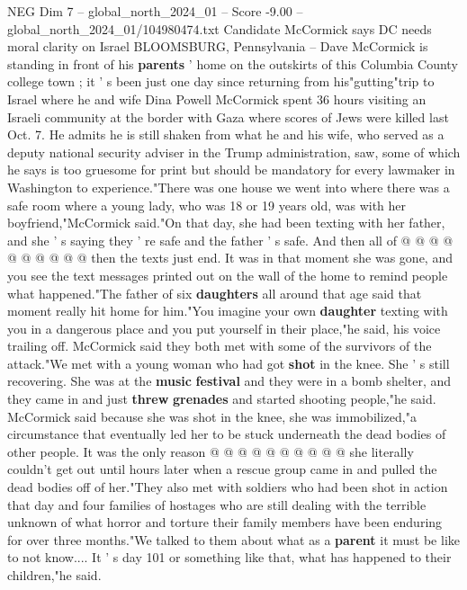 \begin{textsample}{NEG Dim 7 – global\_north\_2024\_01 – Score -9.00 – global\_north\_2024\_01/104980474.txt}  \label{ex:f7_neg_203}
Candidate McCormick says DC needs moral clarity on Israel BLOOMSBURG, Pennsylvania -- Dave McCormick is standing in front of his \textbf{parents} ' home on the outskirts of this Columbia County college town ; it ' s been just one day since returning from his"gutting"trip to Israel where he and wife Dina Powell McCormick spent 36 hours visiting an Israeli community at the border with Gaza where scores of Jews were killed last Oct. 7.
He admits he is still shaken from what he and his wife, who served as a deputy national security adviser in the Trump administration, saw, some of which he says is too gruesome for print but should be mandatory for every lawmaker in Washington to experience."There was one house we went into where there was a safe room where a young lady, who was 18 or 19 years old, was with her boyfriend,"McCormick said."On that day, she had been texting with her father, and she ' s saying they ' re safe and the father ' s safe.
And then all of @ @ @ @ @ @ @ @ @ @ then the texts just end.
It was in that moment she was gone, and you see the text messages printed out on the wall of the home to remind people what happened."The father of six \textbf{daughters} all around that age said that moment really hit home for him."You imagine your own \textbf{daughter} texting with you in a dangerous place and you put yourself in their place,"he said, his voice trailing off.
McCormick said they both met with some of the survivors of the attack."We met with a young woman who had got \textbf{shot} in the knee.
She ' s still recovering.
She was at the \textbf{music} \textbf{festival} and they were in a bomb shelter, and they came in and just \textbf{threw} \textbf{grenades} and started shooting people,"he said.
McCormick said because she was shot in the knee, she was immobilized,"a circumstance that eventually led her to be stuck underneath the dead bodies of other people.
It was the only reason @ @ @ @ @ @ @ @ @ @ she literally couldn't get out until hours later when a rescue group came in and pulled the dead bodies off of her."They also met with soldiers who had been shot in action that day and four families of hostages who are still dealing with the terrible unknown of what horror and torture their family members have been enduring for over three months."We talked to them about what as a \textbf{parent} it must be like to not know....
It ' s day 101 or something like that, what has happened to their children,"he said.

\end{textsample}
